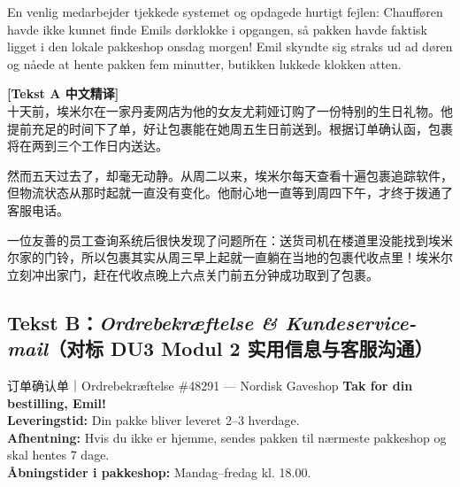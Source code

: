 En venlig medarbejder tjekkede systemet og opdagede hurtigt fejlen: Chaufføren havde ikke kunnet finde Emils dørklokke i opgangen, så pakken havde faktisk ligget i den lokale pakkeshop  onsdag morgen! Emil skyndte sig straks ud ad døren og nåede at hente pakken fem minutter,  butikken lukkede klokken atten.

\begin{transbox}
\small
\textbf{\color{NCDTeal}[Tekst A 中文精译]}\\
十天前，埃米尔在一家丹麦网店为他的女友尤莉娅订购了一份特别的生日礼物。他提前充足的时间下了单，好让包裹能在她周五生日前送到。根据订单确认函，包裹将在两到三个工作日内送达。

然而五天过去了，却毫无动静。从周二以来，埃米尔每天查看十遍包裹追踪软件，但物流状态从那时起就一直没有变化。他耐心地一直等到周四下午，才终于拨通了客服电话。

一位友善的员工查询系统后很快发现了问题所在：送货司机在楼道里没能找到埃米尔家的门铃，所以包裹其实从周三早上起就一直躺在当地的包裹代收点里！埃米尔立刻冲出家门，赶在代收点晚上六点关门前五分钟成功取到了包裹。
\end{transbox}

\subsection*{Tekst B：\textit{Ordrebekræftelse \& Kundeservice-mail}（对标 DU3 Modul 2 实用信息与客服沟通）}

\begin{emailbox}{订单确认单｜Ordrebekræftelse \#48291 --- Nordisk Gaveshop}
\textbf{Tak for din bestilling, Emil!}\\
\textbf{Leveringstid:} Din pakke bliver leveret  2--3 hverdage.\\
\textbf{Afhentning:} Hvis du ikke er hjemme, sendes pakken til nærmeste pakkeshop og skal hentes  7 dage.\\
\textbf{Åbningstider i pakkeshop:} Mandag--fredag  kl. 18.00.
\end{emailbox}

